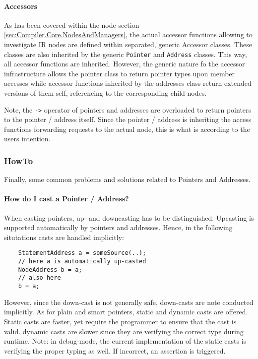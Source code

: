 \paragraph{Accessors}
As has been covered within the node section
\ref{sec:Compiler.Core.NodesAndManagers}, the actual accessor functions allowing
to investigate IR nodes are defined within separated, generic Accessor classes.
These classes are also inherited by the generic \texttt{Pointer} and
\texttt{Address} classes. This way, all accessor functions are inherited.
However, the generic nature fo the accessor infrastructure allows the pointer
class to return pointer types upon member accesses while accessor functions
inherited by the addresses class return extended versions of them self,
referencing to the corresponding child nodes.

Note, the \lstinline|->| operator of pointers and addresses are overloaded to
return pointers to the pointer / address itself. Since the pointer / address is
inheriting the access functions forwarding requests to the actual node, this is
what is according to the users intention.

\subsubsection{HowTo}
Finally, some common problems and solutions related to Pointers and Addresses.

\paragraph{How do I cast a Pointer / Address?}
When casting pointers, up- and downcasting has to be distinguished. Upcasting is
supported automatically by pointers and addresses. Hence, in the following
situtations casts are handled implicitly:
\begin{lstlisting}
	StatementAddress a = someSource(..);
	// here a is automatically up-casted
	NodeAddress b = a;
	// also here
	b = a;
\end{lstlisting}

However, since the down-cast is not generally safe, down-casts are note
conducted implicitly. As for plain and smart pointers, static and dynamic casts
are offered. Static casts are faster, yet require the programmer to ensure that
the cast is valid. dynamic casts are slower since they are verifying the correct
type during runtime. Note: in debug-mode, the current implementation of the
static casts is verifying the proper typing as well. If incorrect, an assertion
is triggered.

